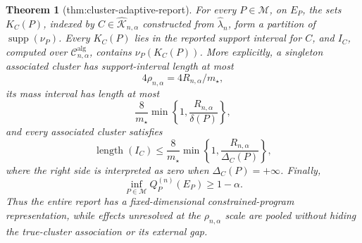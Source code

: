 \documentclass{article}
\newtheorem{theorem}{Theorem}
\begin{document}
\begin{theorem}[thm:cluster-adaptive-report]\label{thm:cluster-adaptive-report}
For every \(P\in\mathcal M\), on \(E_P\), the sets \(K_C(P)\), indexed by \(C\in\widehat{\mathscr K}_{n,\alpha}\) constructed from \(\widehat\lambda_n\), form a partition of \(\operatorname{supp}(\nu_P)\).  Every \(K_C(P)\) lies in the reported support interval for \(C\), and \(I_C\), computed over \(\mathcal C^{\mathrm{alg}}_{n,\alpha}\), contains \(\nu_P(K_C(P))\).  More explicitly, a singleton associated cluster has support-interval length at most
\[
4\rho_{n,\alpha}=4R_{n,\alpha}/m_\star,
\]
its mass interval has length at most
\[
\frac{8}{m_\star}\min\!\left\{1,\frac{R_{n,\alpha}}{\delta(P)}\right\},
\]
and every associated cluster satisfies
\[
\operatorname{length}(I_C)
\le\frac{8}{m_\star}\min\!\left\{1,\frac{R_{n,\alpha}}{\Delta_C(P)}\right\},
\]
where the right side is interpreted as zero when \(\Delta_C(P)=+\infty\).  Finally,
\[
\inf_{P\in\mathcal M}Q_P^{(n)}(E_P)\ge1-\alpha.
\]
Thus the entire report has a fixed-dimensional constrained-program representation, while effects unresolved at the \(\rho_{n,\alpha}\) scale are pooled without hiding the true-cluster association or its external gap.
\end{theorem}
\end{document}
